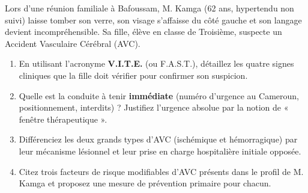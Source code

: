 \documentclass[11pt]{article}
\begin{document}
\begin{exercice}
Lors d'une réunion familiale à Bafoussam, M. Kamga (62 ans, hypertendu non suivi) laisse tomber son verre, son visage s'affaisse du côté gauche et son langage devient incompréhensible. Sa fille, élève en classe de Troisième, suspecte un Accident Vasculaire Cérébral (AVC).
\begin{enumerate}
    \item En utilisant l'acronyme \textbf{V.I.T.E.} (ou F.A.S.T.), détaillez les quatre signes cliniques que la fille doit vérifier pour confirmer son suspicion.
    \item Quelle est la conduite à tenir \textbf{immédiate} (numéro d'urgence au Cameroun, positionnement, interdits) ? Justifiez l'urgence absolue par la notion de « fenêtre thérapeutique ».
    \item Différenciez les deux grands types d'AVC (ischémique et hémorragique) par leur mécanisme lésionnel et leur prise en charge hospitalière initiale opposée.
    \item Citez trois facteurs de risque modifiables d'AVC présents dans le profil de M. Kamga et proposez une mesure de prévention primaire pour chacun.
\end{enumerate}
\end{exercice}
\end{document}
